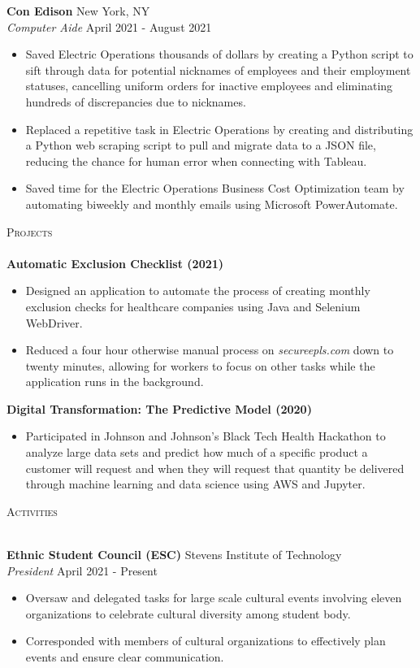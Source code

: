 \documentclass[10pt]{article}
\newcommand{\lineunder} {
    \vspace*{-8pt} \\
    \hspace*{-18pt} \hrulefill \\
}
\newcommand{\header} [1] {
    {\hspace*{-18pt}\vspace*{6pt} \textsc{#1}}
    \vspace*{-6pt} \lineunder
}
\begin{document}
\textbf{Con Edison} \hfill New York, NY\\
\textit{Computer Aide} \hfill April 2021 - August 2021\\
\vspace{-1mm}
\begin{itemize} \itemsep 1pt
    \item Saved Electric Operations thousands of dollars by creating a Python script to sift through data for potential nicknames of employees and their employment statuses, cancelling uniform orders for inactive employees and eliminating hundreds of discrepancies due to nicknames.
    \item Replaced a repetitive task in Electric Operations by creating and distributing a Python web scraping script to pull and migrate data to a JSON file, reducing the chance for human error when connecting with Tableau.
    \item Saved time for the Electric Operations Business Cost Optimization team by automating biweekly and monthly emails using Microsoft PowerAutomate.
\end{itemize}

\header{Projects}

{\textbf{Automatic Exclusion Checklist (2021)}}
\begin{itemize}
    \item Designed an application to automate the process of creating monthly exclusion checks for healthcare companies using Java and Selenium WebDriver.
    \item Reduced a four hour otherwise manual process on \textit{secureepls.com} down to twenty minutes, allowing for workers to focus on other tasks while the application runs in the background. 
\end{itemize}

{\textbf{Digital Transformation: The Predictive Model (2020)}}
\begin{itemize}
    \item Participated in Johnson and Johnson's Black Tech Health Hackathon to analyze large data sets and predict how much of a specific product a customer will request and when they will request that quantity be delivered through machine learning and data science using AWS and Jupyter.
\end{itemize}

\header{Activities}
\vspace{1mm}

\textbf{Ethnic Student Council (ESC)} \hfill Stevens Institute of Technology\\
\textit{President} \hfill April 2021 - Present\\
\vspace{-1mm}
\begin{itemize} \itemsep 1pt
    \item Oversaw and delegated tasks for large scale cultural events involving eleven organizations to celebrate cultural diversity among student body.
    \item Corresponded with members of cultural organizations to effectively plan events and ensure clear communication.
\end{itemize}
\end{document}
